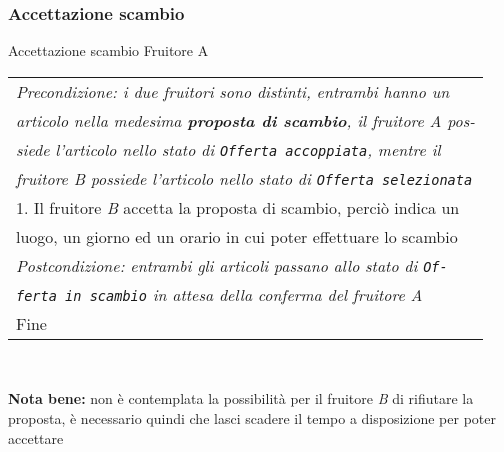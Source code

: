 \begin{minipage}{\textwidth}
    \subsubsection{Accettazione scambio}
    \usecase
        {Accettazione scambio}
        {
            Fruitore A\\
        }
        {
            \begin{tabular}{l}
                \textit{Precondizione: i due fruitori sono distinti, entrambi hanno un}\\
                \textit{articolo nella medesima \textbf{proposta di scambio}, il fruitore A pos-}\\
                \textit{siede l'articolo nello stato di \texttt{Offerta accoppiata}, mentre il}\\
                \textit{fruitore B possiede l'articolo nello stato di \texttt{Offerta selezionata}}\\
                1. Il fruitore \textit{B} accetta la proposta di scambio, perciò indica un\\
                luogo, un giorno ed un orario in cui poter effettuare lo scambio\\
                \textit{Postcondizione: entrambi gli articoli passano allo stato di \texttt{Of-}}\\
                \textit{\texttt{ferta in scambio} in attesa della conferma del fruitore A}\\
                Fine
            \end{tabular}\\

        }
        \vspace{0.5cm}
    \textbf{Nota bene:} non è contemplata la possibilità per il fruitore \textit{B} di rifiutare la proposta, è necessario quindi che lasci scadere il tempo a disposizione per poter accettare
\end{minipage}